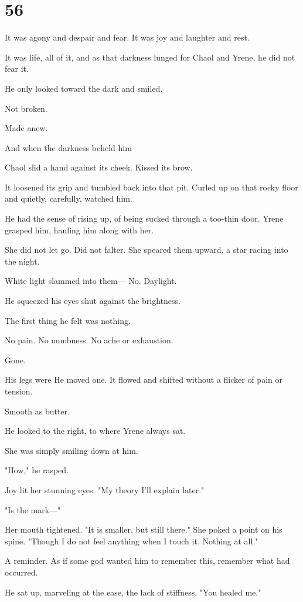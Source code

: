 
\chapter{56}

It was agony and despair and fear. It was joy and laughter and rest.

It was life, all of it, and as that darkness lunged for Chaol and Yrene, he did not fear it.

He only looked toward the dark and smiled.

Not broken.

Made anew.

And when the darkness beheld him 

Chaol slid a hand against its cheek. Kissed its brow.

It loosened its grip and tumbled back into that pit. Curled up on that rocky floor and quietly, carefully, watched him.

He had the sense of rising up, of being sucked through a too-thin door. Yrene grasped him, hauling him along with her.

She did not let go. Did not falter. She speared them upward, a star racing into the night.

White light slammed into them--- No. Daylight.

He squeezed his eyes shut against the brightness.

The first thing he felt was nothing.

No pain. No numbness. No ache or exhaustion.

Gone.

His legs were  He moved one. It flowed and shifted without a flicker of pain or tension.

Smooth as butter.

He looked to the right, to where Yrene always sat.

She was simply smiling down at him.

"How," he rasped.

Joy lit her stunning eyes. "My theory  I'll explain later."

"Is the mark---"

Her mouth tightened. "It is smaller, but  still there." She poked a point on his spine. "Though I do not feel anything when I touch it. Nothing at all."

A reminder. As if some god wanted him to remember this, remember what had occurred.

He sat up, marveling at the ease, the lack of stiffness. "You healed me."

